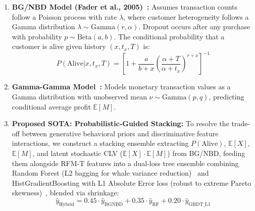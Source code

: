 \documentclass[sigconf,nonacm]{acmart}
\begin{document}
\begin{enumerate}
    \item \textbf{BG/NBD Model (Fader et al., 2005)~\cite{fader2005counting}:} Assumes transaction counts follow a Poisson process with rate $\lambda$, where customer heterogeneity follows a Gamma distribution $\lambda \sim \text{Gamma}(r, \alpha)$. Dropout occurs after any purchase with probability $p \sim \text{Beta}(a, b)$. The conditional probability that a customer is alive given history $(x, t_x, T)$ is:
    \begin{equation}
    P(\text{Alive} | x, t_x, T) = \left[1 + \frac{a}{b + x} \left(\frac{\alpha + T}{\alpha + t_x}\right)^{r + x}\right]^{-1}
    \end{equation}
    \item \textbf{Gamma-Gamma Model~\cite{fader2005rfm}:} Models monetary transaction values as a Gamma distribution with unobserved mean $\nu \sim \text{Gamma}(p, q)$, predicting conditional average profit $\mathbb{E}[M]$.
    \item \textbf{Proposed SOTA: Probabilistic-Guided Stacking:} To resolve the trade-off between generative behavioral priors and discriminative feature interactions, we construct a stacking ensemble extracting $P(\text{Alive})$, $\mathbb{E}[X]$, $\mathbb{E}[M]$, and latent stochastic CLV ($\mathbb{E}[X] \cdot \mathbb{E}[M]$) from BG/NBD, feeding them alongside RFM-T features into a dual-loss tree ensemble combining Random Forest (L2 bagging for whale variance reduction)~\cite{breiman2001random} and HistGradientBoosting with L1 Absolute Error loss (robust to extreme Pareto skewness)~\cite{friedman2001greedy}, blended via shrinkage:
    \begin{equation}
    \hat{y}_{\text{Hybrid}} = 0.45 \cdot \hat{y}_{\text{BGNBD}} + 0.35 \cdot \hat{y}_{\text{RF}} + 0.20 \cdot \hat{y}_{\text{GBDT\_L1}}
    \end{equation}
\end{enumerate}
\end{document}
